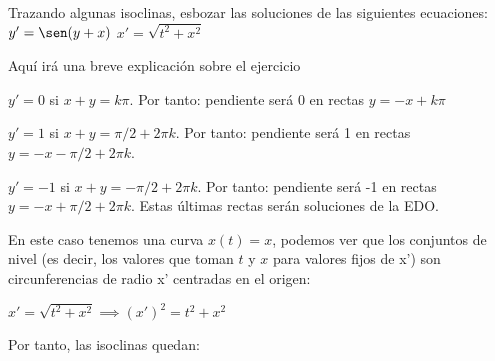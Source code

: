 \documentclass[nochap]{apuntes}
\begin{document}
\begin{problem}[5]
Trazando algunas isoclinas, esbozar las soluciones de las siguientes ecuaciones:
\ppart $y'=\sen (y+x)$
\ppart $x'= \sqrt{t^2+x^2}$

\solution

\begin{expla}
Aquí irá una breve explicación sobre el ejercicio
\end{expla}

\spart
$y'=0$ si $x+y=k\pi$. Por tanto: pendiente será 0 en rectas $y=-x+k\pi$

$y'=1$ si $x+y=\pi/2 +2\pi k$. Por tanto: pendiente será 1 en rectas $y=-x-\pi/2+2\pi k$.

$y'=-1$ si $x+y=-\pi/2 +2\pi k$. Por tanto: pendiente será -1 en rectas $y=-x+\pi/2+2\pi k$.
\indent Estas últimas rectas serán soluciones de la EDO.


\newpage
\spart 
En este caso tenemos una curva $x(t)=x$, podemos ver que los conjuntos de nivel (es decir, los valores que toman $t$ y $x$ para valores fijos de x') son circunferencias de radio x' centradas en el origen:

$x'= \sqrt{t^2+x^2} \implies  (x')^2= t^2+x^2$

Por tanto, las isoclinas quedan:

\end{problem}
\newpage
\end{document}
